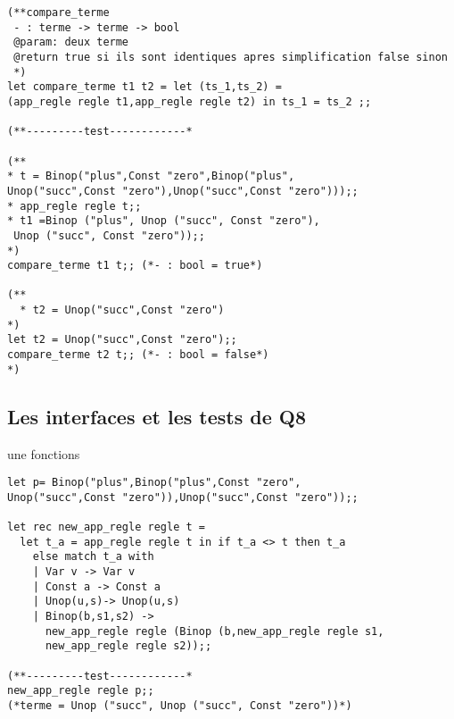 \documentclass[12pt]{amsart}
\begin{document}
\begin{lstlisting}
(**compare_terme
 - : terme -> terme -> bool
 @param: deux terme
 @return true si ils sont identiques apres simplification false sinon
 *)
let compare_terme t1 t2 = let (ts_1,ts_2) = 
(app_regle regle t1,app_regle regle t2) in ts_1 = ts_2 ;;

(**---------test------------*

(**
* t = Binop("plus",Const "zero",Binop("plus",
Unop("succ",Const "zero"),Unop("succ",Const "zero")));;
* app_regle regle t;;
* t1 =Binop ("plus", Unop ("succ", Const "zero"),
 Unop ("succ", Const "zero"));;
*)
compare_terme t1 t;; (*- : bool = true*)

(**
  * t2 = Unop("succ",Const "zero")
*)
let t2 = Unop("succ",Const "zero");;
compare_terme t2 t;; (*- : bool = false*)
*)
 \end{lstlisting}  
 
   \subsection{Les interfaces et les tests de Q8}   une fonctions

\begin{lstlisting}
let p= Binop("plus",Binop("plus",Const "zero",
Unop("succ",Const "zero")),Unop("succ",Const "zero"));;
 
let rec new_app_regle regle t = 
  let t_a = app_regle regle t in if t_a <> t then t_a 
    else match t_a with
    | Var v -> Var v
    | Const a -> Const a
    | Unop(u,s)-> Unop(u,s)
    | Binop(b,s1,s2) ->
      new_app_regle regle (Binop (b,new_app_regle regle s1,
      new_app_regle regle s2));;

(**---------test------------*
new_app_regle regle p;;
(*terme = Unop ("succ", Unop ("succ", Const "zero"))*)

 \end{lstlisting}  
\end{document}
